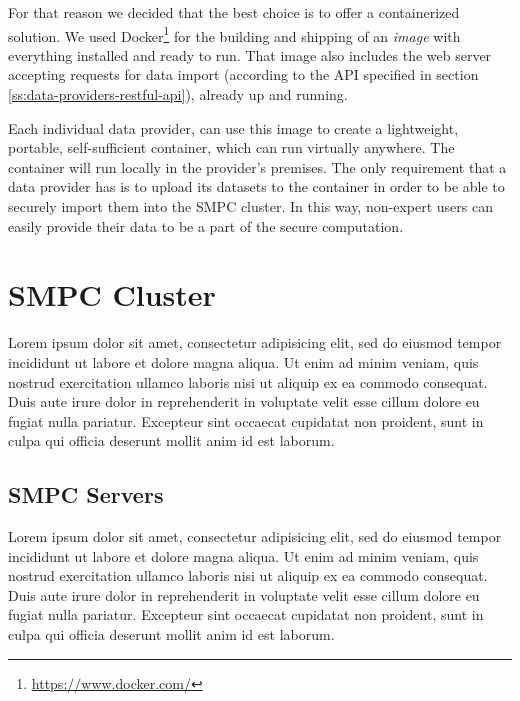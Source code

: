 For that reason we decided that the best choice is to offer a containerized solution. We used Docker\footnote{\href{https://www.docker.com/}{https://www.docker.com/}} for the building and shipping of an \textit{image} with everything installed and ready to run.
That image also includes the web server accepting requests for data import (according to the API specified in section \ref{ss:data-providers-restful-api}), already up and running.

Each individual data provider, can use this image to create a lightweight, portable, self-sufficient container, which can run virtually anywhere.
The container will run locally in the provider's premises.
The only requirement that a data provider has is to upload its datasets to the container in order to be able to securely import them into the SMPC cluster. In this way, non-expert users can easily provide their data to be a part of the secure computation.




\section{SMPC Cluster}\label{s:impl-smpc-cluster}
Lorem ipsum dolor sit amet, consectetur adipisicing elit, sed do eiusmod tempor incididunt ut labore et dolore magna aliqua. Ut enim ad minim veniam, quis nostrud exercitation ullamco laboris nisi ut aliquip ex ea commodo consequat. Duis aute irure dolor in reprehenderit in voluptate velit esse cillum dolore eu fugiat nulla pariatur. Excepteur sint occaecat cupidatat non proident, sunt in culpa qui officia deserunt mollit anim id est laborum.

\subsection{SMPC Servers}\label{ss:smpc-cluster-servers}
Lorem ipsum dolor sit amet, consectetur adipisicing elit, sed do eiusmod tempor incididunt ut labore et dolore magna aliqua. Ut enim ad minim veniam, quis nostrud exercitation ullamco laboris nisi ut aliquip ex ea commodo consequat. Duis aute irure dolor in reprehenderit in voluptate velit esse cillum dolore eu fugiat nulla pariatur. Excepteur sint occaecat cupidatat non proident, sunt in culpa qui officia deserunt mollit anim id est laborum.




